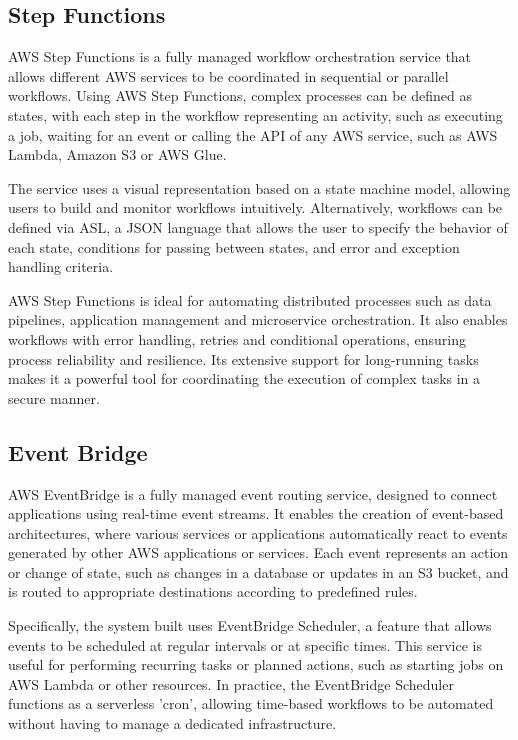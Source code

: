 \subsection{Step Functions}
\ac{AWS} Step Functions is a fully managed workflow orchestration service that allows different \ac{AWS} services to be coordinated in sequential or parallel workflows. Using \ac{AWS} Step Functions, complex processes can be defined as states, with each step in the workflow representing an activity, such as executing a job, waiting for an event or calling the \ac{API} of any \ac{AWS} service, such as \ac{AWS} Lambda, Amazon \ac{S3} or \ac{AWS} Glue.

The service uses a visual representation based on a state machine model, allowing users to build and monitor workflows intuitively. Alternatively, workflows can be defined via \ac{ASL}, a \ac{JSON} language that allows the user to specify the behavior of each state, conditions for passing between states, and error and exception handling criteria.

\ac{AWS} Step Functions is ideal for automating distributed processes such as data pipelines, application management and microservice orchestration. It also enables workflows with error handling, retries and conditional operations, ensuring process reliability and resilience. Its extensive support for long-running tasks makes it a powerful tool for coordinating the execution of complex tasks in a secure manner.
\subsection{Event Bridge}
\ac{AWS} EventBridge is a fully managed event routing service, designed to connect applications using real-time event streams. It enables the creation of event-based architectures, where various services or applications automatically react to events generated by other \ac{AWS} applications or services. Each event represents an action or change of state, such as changes in a database or updates in an \ac{S3} bucket, and is routed to appropriate destinations according to predefined rules.

Specifically, the system built uses EventBridge Scheduler, a feature that allows events to be scheduled at regular intervals or at specific times. This service is useful for performing recurring tasks or planned actions, such as starting jobs on \ac{AWS} Lambda or other resources. In practice, the EventBridge Scheduler functions as a serverless 'cron', allowing time-based workflows to be automated without having to manage a dedicated infrastructure.


